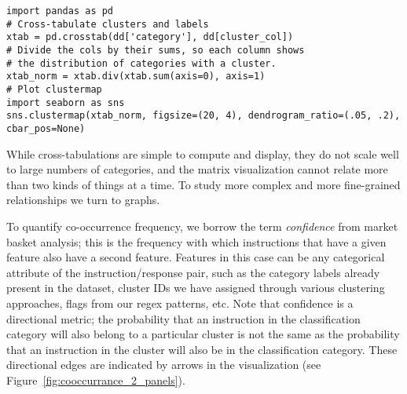 \begin{verbatim}
import pandas as pd
# Cross-tabulate clusters and labels
xtab = pd.crosstab(dd['category'], dd[cluster_col])
# Divide the cols by their sums, so each column shows 
# the distribution of categories with a cluster.
xtab_norm = xtab.div(xtab.sum(axis=0), axis=1)
# Plot clustermap
import seaborn as sns
sns.clustermap(xtab_norm, figsize=(20, 4), dendrogram_ratio=(.05, .2), cbar_pos=None)
\end{verbatim}

While cross-tabulations are simple to compute and display, they do not scale well to large numbers of categories, and the matrix visualization cannot relate more than two kinds of things at a time. To study more complex and more fine-grained relationships we turn to graphs.

To quantify co-occurrence frequency, we borrow the term \emph{confidence} from market basket analysis; this is the frequency with which instructions that have a given feature also have a second feature. Features in this case can be any categorical attribute of the instruction/response pair, such as the category labels already present in the dataset, cluster IDs we have assigned through various clustering approaches, flags from our regex patterns, etc. Note that confidence is a directional metric; the probability that an instruction in the classification category will also belong to a particular cluster is not the same as the probability that an instruction in the cluster will also be in the classification category. These directional edges are indicated by arrows in the visualization (see Figure~\ref{fig:cooccurrance_2_panels}).


